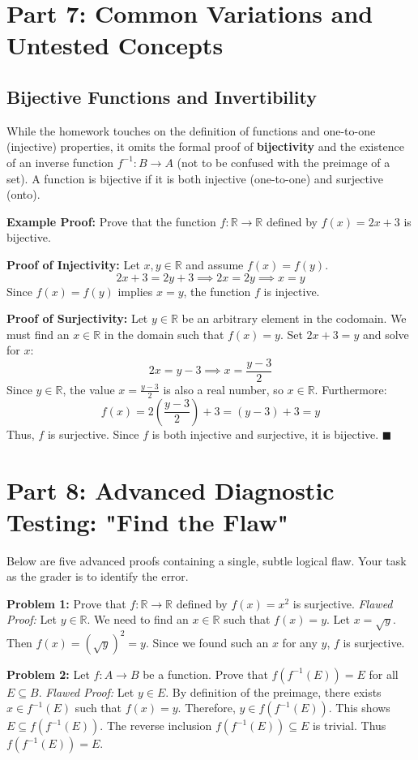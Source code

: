 \documentclass[11pt, a4paper]{article}
\theoremstyle{definition}
\theoremstyle{remark}
\newcommand{\R}{\mathbb{R}}
\begin{document}
\newpage
\section{Part 7: Common Variations and Untested Concepts}

\subsection{Bijective Functions and Invertibility}
While the homework touches on the definition of functions and one-to-one (injective) properties, it omits the formal proof of \textbf{bijectivity} and the existence of an inverse function $f^{-1}: B \to A$ (not to be confused with the preimage of a set). A function is bijective if it is both injective (one-to-one) and surjective (onto).

\textbf{Example Proof:} Prove that the function $f: \R \to \R$ defined by $f(x) = 2x + 3$ is bijective.

\textbf{Proof of Injectivity:} 
Let $x, y \in \R$ and assume $f(x) = f(y)$.
\[ 2x + 3 = 2y + 3 \implies 2x = 2y \implies x = y \]
Since $f(x) = f(y)$ implies $x = y$, the function $f$ is injective.

\textbf{Proof of Surjectivity:}
Let $y \in \R$ be an arbitrary element in the codomain. We must find an $x \in \R$ in the domain such that $f(x) = y$.
Set $2x + 3 = y$ and solve for $x$:
\[ 2x = y - 3 \implies x = \frac{y - 3}{2} \]
Since $y \in \R$, the value $x = \frac{y - 3}{2}$ is also a real number, so $x \in \R$. Furthermore:
\[ f(x) = 2\left(\frac{y - 3}{2}\right) + 3 = (y - 3) + 3 = y \]
Thus, $f$ is surjective. Since $f$ is both injective and surjective, it is bijective. $\blacksquare$

\section{Part 8: Advanced Diagnostic Testing: "Find the Flaw"}

Below are five advanced proofs containing a single, subtle logical flaw. Your task as the grader is to identify the error.

\textbf{Problem 1:} Prove that $f: \R \to \R$ defined by $f(x) = x^2$ is surjective.
\textit{Flawed Proof:} Let $y \in \R$. We need to find an $x \in \R$ such that $f(x) = y$. Let $x = \sqrt{y}$. Then $f(x) = (\sqrt{y})^2 = y$. Since we found such an $x$ for any $y$, $f$ is surjective.

\textbf{Problem 2:} Let $f: A \to B$ be a function. Prove that $f(f^{-1}(E)) = E$ for all $E \subseteq B$.
\textit{Flawed Proof:} Let $y \in E$. By definition of the preimage, there exists $x \in f^{-1}(E)$ such that $f(x) = y$. Therefore, $y \in f(f^{-1}(E))$. This shows $E \subseteq f(f^{-1}(E))$. The reverse inclusion $f(f^{-1}(E)) \subseteq E$ is trivial. Thus $f(f^{-1}(E)) = E$.
\end{document}

